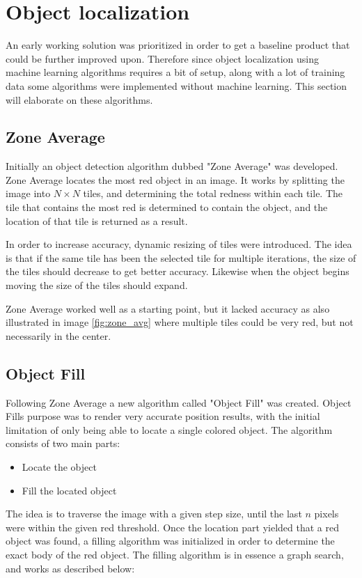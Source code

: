 \section{Object localization}\label{Design:ObjectLocalization}
An early working solution was prioritized in order to get a baseline product that could be further improved upon.
Therefore since object localization using machine learning algorithms requires a bit of setup, along with a lot of training data some algorithms were implemented without machine learning.
This section will elaborate on these algorithms.

\subsection{Zone Average}
Initially an object detection algorithm dubbed "Zone Average" was developed.
Zone Average locates the most red object in an image.
It works by splitting the image into $N\times N$ tiles, and determining the total redness within each tile.
The tile that contains the most red is determined to contain the object, and the location of that tile is returned as a result.

In order to increase accuracy, dynamic resizing of tiles were introduced.
The idea is that if the same tile has been the selected tile for multiple iterations, the size of the tiles should decrease to get better accuracy.
Likewise when the object begins moving the size of the tiles should expand.


Zone Average worked well as a starting point, but it lacked accuracy as also illustrated in image \ref{fig:zone_avg} where multiple tiles could be very red, but not necessarily in the center.

\subsection{Object Fill}
\label{sec:objectfilldesign}
Following Zone Average a new algorithm called "Object Fill" was created.
Object Fills purpose was to render very accurate position results, with the initial limitation of only being able to locate a single colored object.
The algorithm consists of two main parts:
\begin{itemize}
	\item Locate the object
	\item Fill the located object
\end{itemize}
The idea is to traverse the image with a given step size, until the last $n$ pixels were within the given red threshold.
Once the location part yielded that a red object was found, a filling algorithm was initialized in order to determine the exact body of the red object.
The filling algorithm is in essence a graph search, and works as described below:

